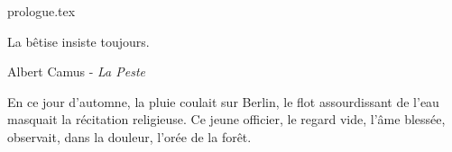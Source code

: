 \documentclass[11pt, a4paper, french]{article}
\begin{document}
    \maketitle
    {prologue.tex}
    \pagebreak

    \epigraph{La bêtise insiste toujours.}{Albert Camus - \textit{La Peste}}\bigskip

    En ce jour d'automne, la pluie coulait sur Berlin,
    le flot assourdissant de l'eau masquait la récitation religieuse.
    Ce jeune officier, le regard vide, l'âme blessée, observait, dans la douleur,
    l'orée de la forêt.
    
    
   
\end{document}
